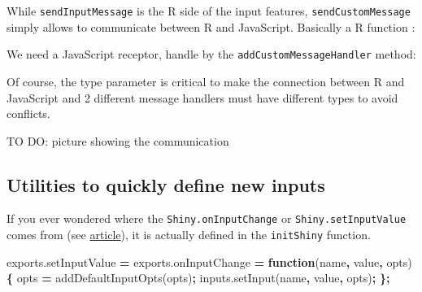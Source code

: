 \documentclass[]{book}
\newenvironment{Shaded}{\begin{snugshade}}{\end{snugshade}}
\newcommand{\AttributeTok}[1]{\textcolor[rgb]{0.77,0.63,0.00}{#1}}
\newcommand{\ControlFlowTok}[1]{\textcolor[rgb]{0.13,0.29,0.53}{\textbf{#1}}}
\newcommand{\DataTypeTok}[1]{\textcolor[rgb]{0.13,0.29,0.53}{#1}}
\newcommand{\KeywordTok}[1]{\textcolor[rgb]{0.13,0.29,0.53}{\textbf{#1}}}
\newcommand{\NormalTok}[1]{#1}
\newcommand{\OperatorTok}[1]{\textcolor[rgb]{0.81,0.36,0.00}{\textbf{#1}}}
\newcommand{\SpecialCharTok}[1]{\textcolor[rgb]{0.00,0.00,0.00}{#1}}
\newcommand{\StringTok}[1]{\textcolor[rgb]{0.31,0.60,0.02}{#1}}
\newcommand{\VariableTok}[1]{\textcolor[rgb]{0.00,0.00,0.00}{#1}}
\newcommand{\VerbatimStringTok}[1]{\textcolor[rgb]{0.31,0.60,0.02}{#1}}
\begin{document}
While \texttt{sendInputMessage} is the R side of the input features, \texttt{sendCustomMessage} simply allows to communicate between R and JavaScript.
Basically a R function :

\begin{Shaded}
\end{Shaded}

We need a JavaScript receptor, handle by the \texttt{addCustomMessageHandler} method:

\begin{Shaded}
\end{Shaded}

Of course, the type parameter is critical to make the connection between R and JavaScript and 2 different message handlers must have different types to avoid conflicts.

TO DO: picture showing the communication

\hypertarget{utilities-to-quickly-define-new-inputs}{%
\subsection{Utilities to quickly define new inputs}\label{utilities-to-quickly-define-new-inputs}}

If you ever wondered where the \texttt{Shiny.onInputChange} or \texttt{Shiny.setInputValue} comes from (see \href{https://shiny.rstudio.com/articles/communicating-with-js.html}{article}), it is actually defined in the \texttt{initShiny} function.

\begin{Shaded}
\begin{Highlighting}[]
\VariableTok{exports}\NormalTok{.}\AttributeTok{setInputValue} \OperatorTok{=} \VariableTok{exports}\NormalTok{.}\AttributeTok{onInputChange} \OperatorTok{=} \KeywordTok{function}\NormalTok{(name}\OperatorTok{,}\NormalTok{ value}\OperatorTok{,}\NormalTok{ opts) }\OperatorTok{\{}
\NormalTok{  opts }\OperatorTok{=} \AttributeTok{addDefaultInputOpts}\NormalTok{(opts)}\OperatorTok{;}
  \VariableTok{inputs}\NormalTok{.}\AttributeTok{setInput}\NormalTok{(name}\OperatorTok{,}\NormalTok{ value}\OperatorTok{,}\NormalTok{ opts)}\OperatorTok{;}
\OperatorTok{\};}
\end{Highlighting}
\end{Shaded}
\end{document}
